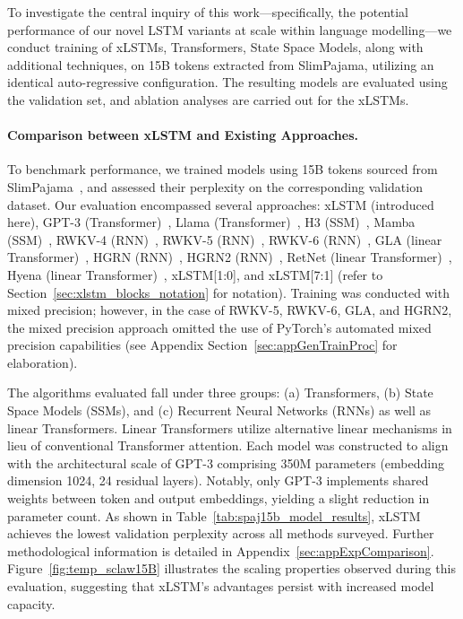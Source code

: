 To investigate the central inquiry of this work—specifically, the potential performance of our novel LSTM variants at scale within language modelling—we conduct training of xLSTMs, Transformers, State Space Models, along with additional techniques, on 15B tokens extracted from SlimPajama, utilizing an identical auto-regressive configuration. The resulting models are evaluated using the validation set, and ablation analyses are carried out for the xLSTMs.

\paragraph{Comparison between xLSTM and Existing Approaches.} To benchmark performance, we trained models using 15B tokens sourced from SlimPajama~\citep{Soboleva:23}, and assessed their perplexity on the corresponding validation dataset. Our evaluation encompassed several approaches: xLSTM (introduced here), GPT-3 (Transformer)~\citep{Brown:20short}, Llama (Transformer)~\citep{Touvron:23arxiv}, H3 (SSM)~\citep{Fu:23}, Mamba (SSM)~\citep{Gu:24arxiv}, RWKV-4 (RNN)~\citep{Peng:23arxivshort}, RWKV-5 (RNN)~\citep{Peng:24arxivshort}, RWKV-6 (RNN)~\citep{Peng:24arxivshort}, GLA (linear Transformer)~\citep{Yang:23arxiv}, HGRN (RNN)~\citep{Qin:23}, HGRN2 (RNN)~\citep{Qin:24arxiv}, RetNet (linear Transformer)~\citep{Sun:23arxiv}, Hyena (linear Transformer)~\citep{Poli:23}, xLSTM[1:0], and xLSTM[7:1] (refer to Section~\ref{sec:xlstm_blocks_notation} for notation). Training was conducted with mixed precision; however, in the case of RWKV-5, RWKV-6, GLA, and HGRN2, the mixed precision approach omitted the use of PyTorch’s automated mixed precision capabilities (see Appendix Section~\ref{sec:appGenTrainProc} for elaboration).

The algorithms evaluated fall under three groups: (a) Transformers, (b) State Space Models (SSMs), and (c) Recurrent Neural Networks (RNNs) as well as linear Transformers. Linear Transformers utilize alternative linear mechanisms in lieu of conventional Transformer attention. Each model was constructed to align with the architectural scale of GPT-3 comprising 350M parameters (embedding dimension 1024, 24 residual layers). Notably, only GPT-3 implements shared weights between token and output embeddings, yielding a slight reduction in parameter count. As shown in Table~\ref{tab:spaj15b_model_results}, xLSTM achieves the lowest validation perplexity across all methods surveyed. Further methodological information is detailed in Appendix~\ref{sec:appExpComparison}. Figure~\ref{fig:temp_sclaw15B} illustrates the scaling properties observed during this evaluation, suggesting that xLSTM’s advantages persist with increased model capacity.

